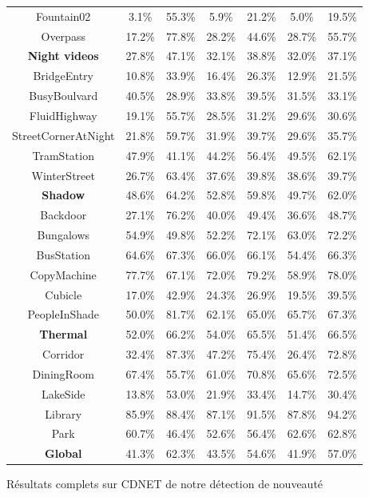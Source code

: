 \begin{tableth}
\begin{tabular}{|c|c|c|c|c|c|c|}
		Fountain02 & 3.1\% & 55.3\% & 5.9\% & 21.2\% & 5.0\% & 19.5\% \\
		Overpass & 17.2\% & 77.8\% & 28.2\% & 44.6\% & 28.7\% & 55.7\% \\
		\hline
        \textbf{Night videos} & 27.8\% & 47.1\% & 32.1\% & 38.8\% & 32.0\% & 37.1\% \\
		\hline
		BridgeEntry & 10.8\% & 33.9\% & 16.4\% & 26.3\% & 12.9\% & 21.5\% \\
		BusyBoulvard & 40.5\% & 28.9\% & 33.8\% & 39.5\% & 31.5\% & 33.1\% \\
		FluidHighway & 19.1\% & 55.7\% & 28.5\% & 31.2\% & 29.6\% & 30.6\% \\
		StreetCornerAtNight & 21.8\% & 59.7\% & 31.9\% & 39.7\% & 29.6\% & 35.7\% \\
		TramStation & 47.9\% & 41.1\% & 44.2\% & 56.4\% & 49.5\% & 62.1\% \\
		WinterStreet & 26.7\% & 63.4\% & 37.6\% & 39.8\% & 38.6\% & 39.7\% \\
		\hline
        \textbf{Shadow} & 48.6\% & 64.2\% & 52.8\% & 59.8\% & 49.7\% & 62.0\% \\
		\hline
		Backdoor & 27.1\% & 76.2\% & 40.0\% & 49.4\% & 36.6\% & 48.7\% \\
		Bungalows & 54.9\% & 49.8\% & 52.2\% & 72.1\% & 63.0\% & 72.2\% \\
		BusStation & 64.6\% & 67.3\% & 66.0\% & 66.1\% & 54.4\% & 66.3\% \\
		CopyMachine & 77.7\% & 67.1\% & 72.0\% & 79.2\% & 58.9\% & 78.0\% \\
		Cubicle & 17.0\% & 42.9\% & 24.3\% & 26.9\% & 19.5\% & 39.5\% \\
		PeopleInShade & 50.0\% & 81.7\% & 62.1\% & 65.0\% & 65.7\% & 67.3\% \\
		\hline
        \textbf{Thermal} & 52.0\% & 66.2\% & 54.0\% & 65.5\% & 51.4\% & 66.5\% \\
		\hline
		Corridor & 32.4\% & 87.3\% & 47.2\% & 75.4\% & 26.4\% & 72.8\% \\
		DiningRoom & 67.4\% & 55.7\% & 61.0\% & 70.8\% & 65.6\% & 72.5\% \\
		LakeSide & 13.8\% & 53.0\% & 21.9\% & 33.4\% & 14.7\% & 30.4\% \\
		Library & 85.9\% & 88.4\% & 87.1\% & 91.5\% & 87.8\% & 94.2\% \\
		Park & 60.7\% & 46.4\% & 52.6\% & 56.4\% & 62.6\% & 62.8\% \\
		\hline
        \textbf{Global} & 41.3\% & 62.3\% & 43.5\% & 54.6\% & 41.9\% & 57.0\% \\
    	\hline
	\end{tabular}
	\caption{Résultats complets sur CDNET de notre détection de nouveauté}
	\label{tab:res:complet1}
	\end{tableth}


